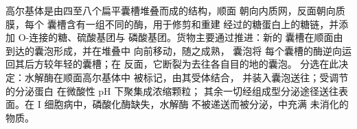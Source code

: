 \begin{proposition}[高尔基体]\label{prop:b3:membrane-traffic:golgi}
高尔基体是由四至八个扁平囊槽堆叠而成的结构，顺面
朝向内质网，反面朝向质膜，每个
囊槽含有一组不同的酶，用于修剪和重建
经过的糖蛋白上的糖链，并添加 O-连接的糖、硫酸基团与
磷酸基团。货物主要通过\emph{}推进：新的
囊槽在顺面由到达的囊泡形成，并在堆叠中
向前移动，随之成熟， 囊泡将
每个囊槽的酶逆向运回其后方较年轻的囊槽；在
反面，它断裂为去往各自目的地的囊泡。
分选在此决定：水解酶在顺面高尔基体中
被\emph{}标记，由其受体结合，
并装入囊泡送往；受调节的分泌蛋白
在微酸性 pH 下聚集成浓缩颗粒；
其余一切经组成型分泌途径送往表面。在
I 细胞病中，磷酸化酶缺失，水解酶
不被递送而被分泌，中充满
未消化的物质。
\end{proposition}

